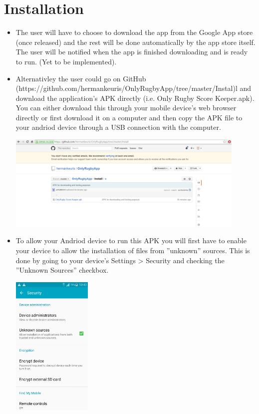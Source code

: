 \documentclass[hidelinks,a4paper,12pt]{article}
\begin{document}
\section{Installation}
\begin {itemize}
	\item The user will have to choose to download the app from the Google App store (once released) and the rest will be done automatically by the app store itself. The user will be notified when the app is finished downloading and is ready to run. (Yet to be implemented).
	\item Alternativley the user could go on GitHub (https://github.com/hermankeuris/OnlyRugbyApp/tree/master/Instal)l and download the application's APK directly (i.e. Only Rugby Score Keeper.apk). You can either download this through your mobile device's web browser directly or first download it on a computer and then copy the APK file to your andriod device through a USB connection with the computer.
	\begin{center}
  		 \includegraphics[width=0.9\textwidth] {./images/APKdownload.png}\\[0.4cm]
	\end{center}
	\item To allow your Andriod device to run this APK you will first have to enable your device to allow the installation of files from ''unknown'' sources. This is done by going to your device's Settings > Security and checking the ''Unknown Sources'' checkbox.
	\begin{center}
  		 \includegraphics[width=0.3\textwidth] {./images/unknownsources.png}\\[0.4cm]

\end{center}
\end{itemize}
\end{document}
